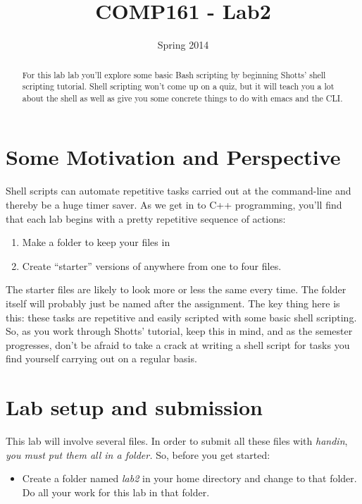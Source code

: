 \documentclass[]{tufte-handout}
\title{COMP161 - Lab2}
\author{}
\date{Spring 2014}
\begin{document}
\maketitle

\begin{abstract}
For this lab lab you'll explore some basic Bash scripting by beginning Shotts' shell scripting tutorial.  Shell scripting won't come up on a quiz, but it will teach you a lot about the shell as well as give you some concrete things to do with emacs and the CLI.  
\end{abstract}

\section{Some Motivation and Perspective}

Shell scripts can automate repetitive tasks carried out at the command-line and thereby be a huge timer saver.  As we get in to C++ programming, you'll find that each lab begins with a pretty repetitive sequence of actions:
\begin{enumerate}
\item Make a folder to keep your files in
\item Create ``starter'' versions of anywhere from one to four files.
\end{enumerate} 
The starter files are likely to look more or less the same every time. The folder itself will probably just be named after the assignment.  The key thing here is this: these tasks are repetitive and easily scripted with some basic shell scripting.  So, as you work through Shotts' tutorial, keep this in mind, and as the semester progresses, don't be afraid to take a crack at writing a shell script for tasks you find yourself carrying out on a regular basis.

\section{Lab setup and submission}

This lab will involve several files.  In order to submit all these files with \textit{handin}, \textit{you must put them all in a folder.}  So, before you get started:
\begin{itemize}
\item Create a folder named \textit{lab2} in your home directory and change to that folder.  Do all your work for this lab in that folder.  
\end{itemize}
\end{document}
